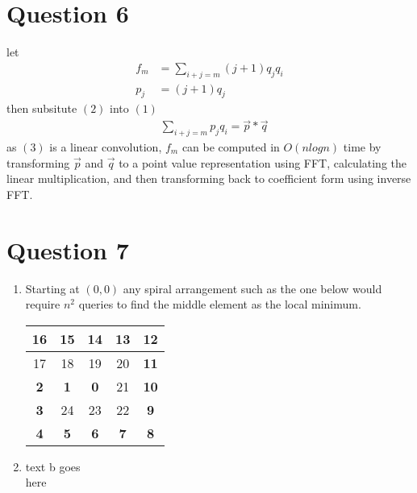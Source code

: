 \documentclass{article}
\begin{document}
\section*{Question 6}
let
\begin{align}
    f_m &= \sum_{i+j=m} (j+1)q_jq_i \\
    p_j &= (j+1)q_j
\end{align}
then subsitute $(2)$ into $(1)$
\begin{align}
    & \sum_{i+j=m} p_jq_i = \vec{p} \ast \vec{q}
\end{align}
as $(3)$ is a linear convolution, $f_m$ can be computed in $O(nlog{n})$ time by transforming $\vec{p}$ and $\vec{q}$ to a point value representation using FFT, calculating the linear multiplication, and then transforming back to coefficient form using inverse FFT.


\section*{Question 7}
\begin{enumerate}[label=\alph*)]
    \item Starting at $(0,0)$ any spiral arrangement such as the one below would require $n^2$ queries to find the middle element as the local minimum.
        \begin{center}
        \begin{tabular}{|c|c|c|c|c|}
            \hline
            \textbf{16} & \textbf{15} & \textbf{14} & \textbf{13} & \textbf{12} \\ \hline
            17          & 18          & 19          & 20          & \textbf{11} \\ \hline
            \textbf{2}  & \textbf{1}  & \textbf{0}  & 21          & \textbf{10} \\ \hline
            \textbf{3}  & 24          & 23          & 22          & \textbf{9}  \\ \hline
            \textbf{4}  & \textbf{5}  & \textbf{6}  & \textbf{7}  & \textbf{8}  \\ \hline
        \end{tabular}
        \end{center}
    \item text b goes\\
        here
\end{enumerate}
\end{document}

